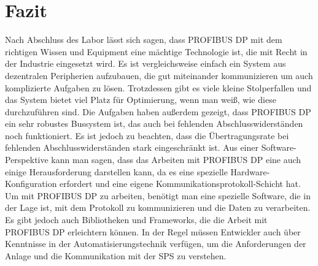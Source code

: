 \documentclass{report}
\begin{document}
\section{Fazit}

Nach Abschluss des Labor lässt sich sagen, dass PROFIBUS DP mit dem richtigen Wissen und Equipment eine mächtige Technologie ist, die mit Recht in der Industrie eingesetzt wird. Es ist vergleichsweise einfach ein System aus dezentralen Peripherien aufzubauen, die gut miteinander kommunizieren um auch komplizierte Aufgaben zu lösen. Trotzdessen gibt es viele kleine Stolperfallen und das System bietet viel Platz für Optimierung, wenn man weiß, wie diese durchzuführen sind. 
Die Aufgaben haben außerdem gezeigt, dass PROFIBUS DP ein sehr robustes Bussystem ist, das auch bei fehlenden Abschlusswiderständen noch funktioniert. Es ist jedoch zu beachten, dass die Übertragungsrate bei fehlenden Abschlusswiderständen stark eingeschränkt ist.
Aus einer Software-Perspektive kann man sagen, dass das Arbeiten mit PROFIBUS DP eine auch einige Herausforderung darstellen kann, da es eine spezielle Hardware-Konfiguration erfordert und eine eigene Kommunikationsprotokoll-Schicht hat. Um mit PROFIBUS DP zu arbeiten, benötigt man eine spezielle Software, die in der Lage ist, mit dem Protokoll zu kommunizieren und die Daten zu verarbeiten. Es gibt jedoch auch Bibliotheken und Frameworks, die die Arbeit mit PROFIBUS DP erleichtern können. In der Regel müssen Entwickler auch über Kenntnisse in der Automatisierungstechnik verfügen, um die Anforderungen der Anlage und die Kommunikation mit der SPS zu verstehen.
\end{document}
